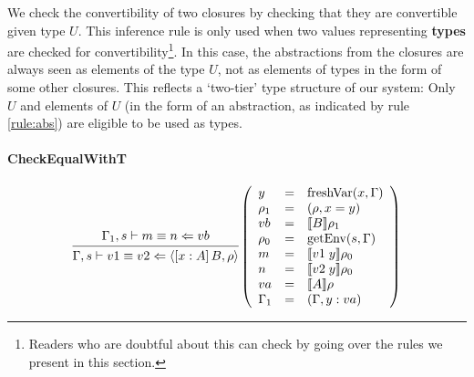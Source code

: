 \documentclass{article}
\theoremstyle{remark}
\begin{document}
We check the convertibility of two closures by checking that they are convertible given type $U$. This inference rule is only used when two values representing \textbf{types} are checked for convertibility\footnote{Readers who are doubtful about this can check by going over the rules we present in this section.}. In this case, the abstractions from the closures are always seen as elements of the type $U$, not as elements of types in the form of some other closures. This reflects a `two-tier' type structure of our system: Only $U$ and elements of $U$ (in the form of an abstraction, as indicated by rule \ref{rule:abs}) are eligible to be used as types.

\paragraph{CheckEqualWithT}
\begin{align}
  \begin{prooftree}
    \hypo{\Gamma_1,s \vdash m \equiv n \Leftarrow vb}
    \infer1{\Gamma,s \vdash v1 \equiv v2 \Leftarrow \langle [x : A] \, B, \rho \rangle} 
  \end{prooftree}\left(\begin{array}{l l l}
                         y &= & \text{freshVar}(x, \Gamma) \\
                         \rho_1 &= & (\rho, x = y) \\
                         vb &= & \llbracket B \rrbracket \rho_1 \\ 
                         \rho_0 &= & \text{getEnv}(s, \Gamma) \\
                         m &= & \llbracket  v1 \; y \rrbracket \rho_0 \\
                         n &= & \llbracket v2 \; y \rrbracket \rho_0 \\
                         va &= & \llbracket A \rrbracket \rho \\
                         \Gamma_1 &= & (\Gamma, y : va)
                       \end{array}\right)
\end{align}
\end{document}
